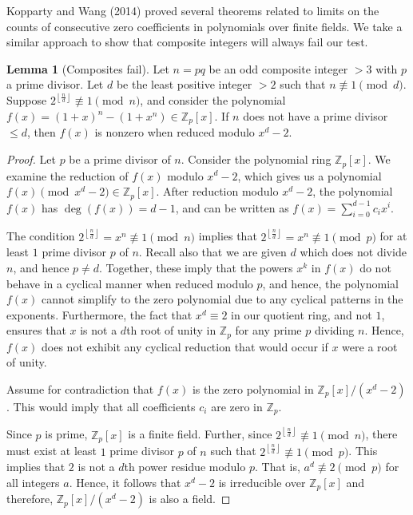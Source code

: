 \documentclass{article}
\theoremstyle{plain}
\theoremstyle{definition}
\newtheorem{lemma}{Lemma}
\begin{document}
Kopparty and Wang (2014) \cite{koppartywang2014roots} proved several theorems related to limits on the counts of consecutive zero coefficients in polynomials over finite fields. We take a similar approach to show that composite integers will always fail our test.

\begin{lemma}[Composites fail] \label{lemma:composites}
Let $n = pq$ be an odd composite integer $>3$ with $p$ a prime divisor. Let $d$ be the least positive integer $>2$ such that $n \not\equiv 1 \pmod{d}$. Suppose $2^{\left\lfloor\frac{n}{d}\right\rfloor} \not\equiv 1 \pmod{n}$, and consider the polynomial $f(x) = (1 + x)^n - (1 + x^n) \in \mathbb{Z}_p[x]$. If $n$ does not have a prime divisor $\leq d$, then $f(x)$ is nonzero when reduced modulo $x^d - 2$.
\end{lemma}
\begin{proof}
Let $p$ be a prime divisor of $n$. Consider the polynomial ring $\mathbb{Z}_p[x]$. We examine the reduction of $ f(x) $ modulo $x^d - 2$, which gives us a polynomial $f(x) \pmod{x^d - 2} \in \mathbb{Z}_p[x]$. After reduction modulo $x^d - 2$, the polynomial $f(x)$ has $\deg(f(x)) = d-1$, and can be written as $f(x) = \sum_{i=0}^{d-1} c_i x^i$.

The condition $2^{\left\lfloor\frac{n}{d}\right\rfloor} = x^n \not\equiv 1 \pmod{n}$ implies that $2^{\left\lfloor\frac{n}{d}\right\rfloor} = x^n \not\equiv 1 \pmod{p}$ for at least $1$ prime divisor $p$ of $n$. Recall also that we are given $d$ which does not divide $n$, and hence $p \not= d$. Together, these imply that the powers $x^k$ in $f(x)$ do not behave in a cyclical manner when reduced modulo $p$, and hence, the polynomial $f(x)$ cannot simplify to the zero polynomial due to any cyclical patterns in the exponents. Furthermore, the fact that $x^d \equiv 2$ in our quotient ring, and not $1$, ensures that $x$ is not a $d$th root of unity in $\mathbb{Z}_p$ for any prime $p$ dividing $n$. Hence, $f(x)$ does not exhibit any cyclical reduction that would occur if $x$ were a root of unity.

Assume for contradiction that $f(x)$ is the zero polynomial in $\mathbb{Z}_p[x]/(x^d - 2)$. This would imply that all coefficients $c_i$ are zero in $\mathbb{Z}_p$.

Since $p$ is prime, $\mathbb{Z}_p[x]$ is a finite field. Further, since $2^{\left\lfloor\frac{n}{d}\right\rfloor} \not\equiv 1 \pmod{n}$, there must exist at least $1$ prime divisor $p$ of $n$ such that $2^{\left\lfloor\frac{n}{d}\right\rfloor} \not\equiv 1 \pmod{p}$. This implies that $2$ is not a $d$th power residue modulo $p$. That is, $a^d \not\equiv 2 \pmod{p}$ for all integers $a$. Hence, it follows that $x^d - 2$ is irreducible over $\mathbb{Z}_p[x]$ and therefore, $\mathbb{Z}_p[x]/(x^d - 2)$ is also a field.


\end{proof}
\end{document}
